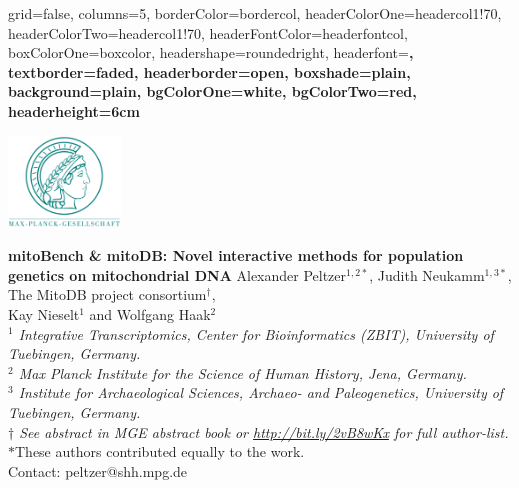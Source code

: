 \documentclass[a0paper,portrait]{baposter}
\begin{document}

\begin{poster}{
	grid=false,
	columns=5,
	borderColor=bordercol,
	headerColorOne=headercol1!70,%
	headerColorTwo=headercol1!70,%
	headerFontColor=headerfontcol,
	boxColorOne=boxcolor,
	headershape=roundedright,
	headerfont=\large\sf\bf,
	textborder=faded,%
	headerborder=open,
  	boxshade=plain,
	background=plain,
	bgColorOne=white,
	bgColorTwo=red,
	headerheight=6cm
}
{

	\includegraphics[width=3cm]{figures/Max-Planck-Gesellschaft.png}

}
{\Large\bf
	mitoBench \& mitoDB: Novel interactive methods for population genetics on mitochondrial DNA
}
{
	\vspace{1em} Alexander Peltzer$^{1,2*}$, Judith Neukamm$^{1,3*}$, The MitoDB project consortium$^\dagger$,\\ Kay Nieselt$^{1}$ and Wolfgang Haak$^{2}$\\
	{\footnotesize \textit{$^1$ Integrative Transcriptomics, Center for Bioinformatics (ZBIT), University of Tuebingen, Germany.\\
	$^2$ Max Planck Institute for the Science of Human History, Jena, Germany.\\
	$^3$ Institute for Archaeological Sciences, Archaeo- and Paleogenetics, University of Tuebingen, Germany.\\
	$\dagger$ See abstract in MGE abstract book or \url{http://bit.ly/2vB8wKx} for full author-list.}\\
	$*$These authors contributed equally to the work. \\
	\vspace{1em}
	Contact: peltzer@shh.mpg.de
	}
}
{

}
\end{poster}
\end{document}
